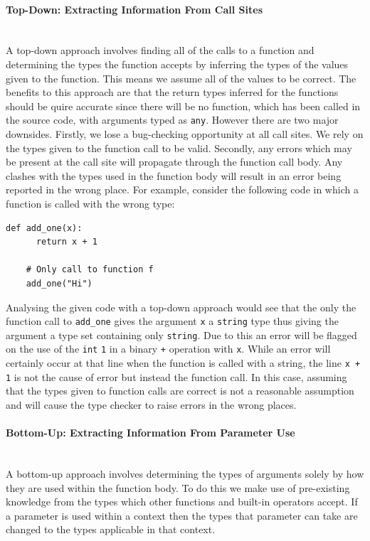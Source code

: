 \documentclass[12pt, titlepage]{article}
\begin{document}
\paragraph*{Top-Down: Extracting Information From Call Sites}\mbox{} \\
A top-down approach involves finding all of the calls to a function and determining the types the function accepts by inferring the types of the values given to the function. This means we assume all of the values to be correct. The benefits to this approach are that the return types inferred for the functions should be quire accurate since there will be no function, which has been called in the source code, with arguments typed as \texttt{any}. However there are two major downsides. Firstly, we lose a bug-checking opportunity at all call sites. We rely on the types given to the function call to be valid. Secondly, any errors which may be present at the call site will propagate through the function call body. Any clashes with the types used in the function body will result in an error being reported in the wrong place. For example, consider the following code in which a function is called with the wrong type:
\begin{lstlisting}[mathescape]
    def add_one(x):
      return x + 1    	
    	
    # Only call to function f
    add_one("Hi")
\end{lstlisting}
Analysing the given code with a top-down approach would see that the only the function call to \texttt{add\_one} gives the argument \texttt{x} a \texttt{string} type thus giving the argument a type set containing only \texttt{string}. Due to this an error will be flagged on the use of the \texttt{int} \texttt{1} in a binary \texttt{+} operation with \texttt{x}. While an error will certainly occur at that line when the function is called with a string, the line \texttt{x + 1} is not the cause of error but instead the function call. In this case, assuming that the types given to function calls are correct is not a reasonable assumption and will cause the type checker to raise errors in the wrong places.

\paragraph*{Bottom-Up: Extracting Information From Parameter Use}\mbox{} \\
A bottom-up approach involves determining the types of arguments solely by how they are used within the function body. To do this we make use of pre-existing knowledge from the types which other functions and built-in operators accept. If a parameter is used within a context then the types that parameter can take are changed to the types applicable in that context. \\
\end{document}
